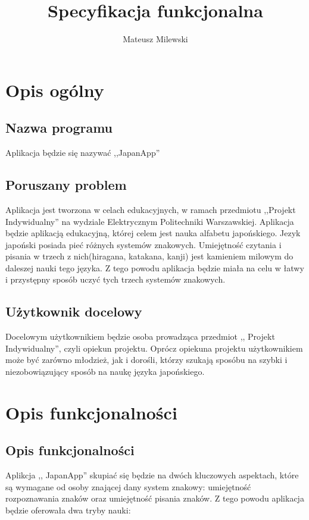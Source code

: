 \documentclass[15pt]{article}
\author{Mateusz Milewski}
\title{\textbf{Specyfikacja funkcjonalna}}
\begin{document}
\maketitle
\tableofcontents
\clearpage
\section{Opis ogólny}
\subsection{Nazwa programu}
Aplikacja będzie się nazywać ,,JapanApp''
\subsection{Poruszany problem}
Aplikacja jest tworzona w celach edukacyjnych, w ramach przedmiotu ,,Projekt Indywidualny'' na wydziale Elektrycznym Politechniki Warszawskiej. Aplikacja będzie aplikacją edukacyjną, której celem jest nauka alfabetu japońskiego. Jezyk japoński posiada pieć różnych systemów znakowych. Umiejętność czytania i pisania w trzech z nich(hiragana, katakana, kanji) jest kamieniem milowym do daleszej nauki tego języka. Z tego powodu aplikacja będzie miała na celu w łatwy i przystępny sposób uczyć tych trzech systemów znakowych.
\subsection{Użytkownik docelowy} 
Docelowym użytkownikiem będzie osoba prowadząca przedmiot ,, Projekt Indywidualny'', czyli opiekun projektu. Oprócz opiekuna projektu użytkownikiem może być zarówno młodzież, jak i dorośli, którzy szukają sposóbu na szybki i niezobowiązujący sposób na naukę języka japońskiego. 



\section{Opis funkcjonalności}
\subsection{Opis funkcjonalności}
Aplikcja ,, JapanApp'' skupiać się będzie na dwóch kluczowych aspektach, które są wymagane od osoby znającej dany system znakowy: umiejętność rozpoznawania znaków oraz umiejętność pisania znaków. Z tego powodu aplikacja będzie oferowała dwa tryby nauki:
\end{document}
